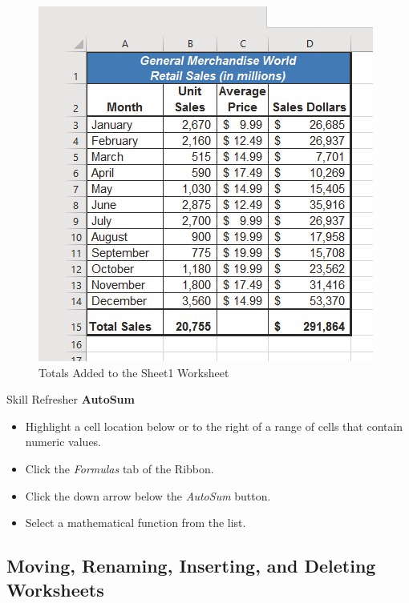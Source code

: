 \begin{figure}[H]
	\centering
	\includegraphics[width=\maxwidth{.95\linewidth}]{gfx/ch01_fig46}
	\caption{Totals Added to the Sheet1 Worksheet}
	\label{01:fig46}
\end{figure}

\begin{center}
	\begin{sklbox}{Skill Refresher}
		\textbf{AutoSum}
		\\
		\begin{itemize}
			\setlength{\itemsep}{0pt}
			\setlength{\parskip}{0pt}
			\setlength{\parsep}{0pt}
			
			\item Highlight a cell location below or to the right of a range of cells that contain numeric values.
			\item Click the \textit{Formulas} tab of the Ribbon.
			\item Click the down arrow below the \textit{AutoSum} button.
			\item Select a mathematical function from the list.
			
		\end{itemize}
	\end{sklbox}
\end{center}

\subsection{Moving, Renaming, Inserting, and Deleting Worksheets}


